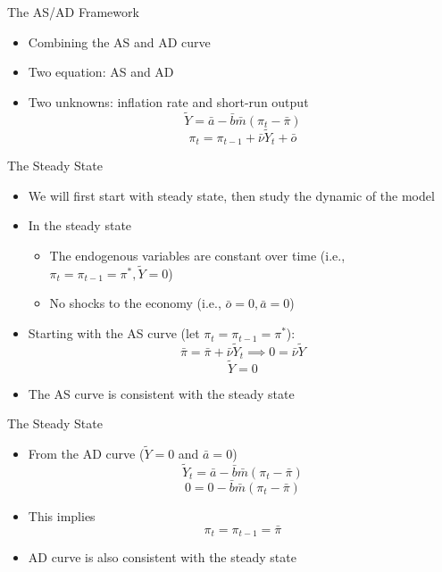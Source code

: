 \documentclass[aspectratio=1610]{beamer}
\begin{document}
\begin{frame}[wide]{The AS/AD Framework}
	\begin{itemize}
		\item Combining the AS and AD curve
		\vspace{4mm}
		\item Two equation: AS and AD
		\vspace{4mm}
		\item Two unknowns: inflation rate and short-run output
		\vspace{2mm}
		\[\tilde{Y} = \bar{a} - \bar{b} \bar{m} \left(\pi_t - \bar{\pi}\right)\]
		\[\pi_t = \pi_{t-1} + \bar{\nu} \tilde{Y}_t + \bar{o}\]
	\end{itemize}
\end{frame}


\begin{frame}[wide]{The Steady State}
	\begin{itemize}
		\item We will first start with steady state, then study the dynamic of the model
		\vspace{3mm}
		\item In the steady state
		\vspace{2mm}
		\begin{itemize}
			\item The endogenous variables are constant over time (i.e., $\pi_t =\pi_{t-1} = \pi^*, \tilde{Y} = 0$)
			\item No shocks to the economy (i.e., $\bar{o} = 0, \bar{a} = 0$)
		\end{itemize}
		\vspace{3mm}
		\item Starting with the AS curve (let $\pi_t=\pi_{t-1} = \pi^*$):
		\vspace{2mm}
		\[\bar{\pi} = \bar{\pi} + \bar{\nu} \tilde{Y}_t  \implies 0 = \bar{\nu} \tilde{Y} \]
		\[ \tilde{Y} = 0\]
		\vspace{1mm}
		\item The AS curve is consistent with the steady state
	\end{itemize}
\end{frame}

\begin{frame}[wide]{The Steady State}
	\begin{itemize}
		\item From the AD curve ($\tilde{Y}= 0 $ and $\bar{a} = 0 $)
		\vspace{2mm}
		\[\tilde{Y}_t = \bar{a} - \bar{b}\bar{m} \left(\pi_t - \bar{\pi}\right)\]
		\[0 = 0 - \bar{b}\bar{m} \left(\pi_t - \bar{\pi}\right)\]
		\vspace{2mm}
		\item This implies 
		\vspace{2mm}
		\[\pi_t=\pi_{t-1}=\bar{\pi}\]
		\vspace{2mm}
		\item AD curve is also consistent with the steady state
	\end{itemize}
\end{frame}
\end{document}
